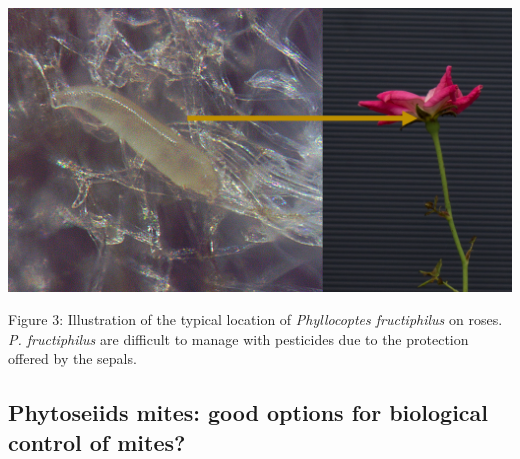 \documentclass[12pt,final,CPage]{ufthesis}
\begin{document}
{  \begin{center}\includegraphics[width=0.8\linewidth]{figure/mite-pfruct-hide} \end{center}

  Figure 3: Illustration of the typical location of \emph{Phyllocoptes fructiphilus} on roses. \emph{P. fructiphilus} are difficult to manage with pesticides due to the protection offered by the sepals.

  \hypertarget{preds-litrev}{%
  \subsection{Phytoseiids mites: good options for biological control of mites?}\label{preds-litrev}}

}
\end{document}
